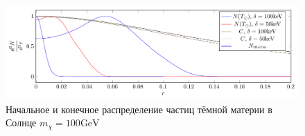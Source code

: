 
\begin{figure}[!h]
	\centering
	\includegraphics[width=\textwidth]{images/Rdistribs.png}
	\caption{Начальное и конечное распределение частиц тёмной материи в Солнце $m_{\chi} = 100\text{GeV}$}
	\label{plot:Nrdistrib}
\end{figure}

